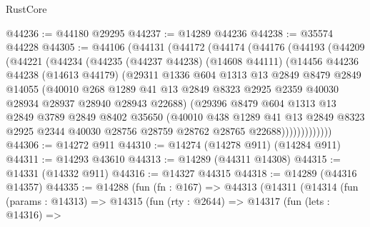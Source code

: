 \begin{lexlean}{RustCore}
\begin{coremodule}
@44236 := @44180 @29295
@44237 := @14289 @44236
@44238 := @35574 @44228
@44305 := @44106
    (@44131
      (@44172
        (@44174
          (@44176
            (@44193
              (@44209
                (@44221
                  (@44234
                    (@44235
                      (@44237 @44238)
                      (@14608 @44111)
                      (@14456
                        @44236
                        @44238
                        (@14613 @44179)
                        (@29311
                          @1336
                          @604
                          @1313
                          @13
                          @2849
                          @8479
                          @2849
                          @14055
                          (@40010
                            @268
                            @1289
                            @41
                            @13
                            @2849
                            @8323
                            @2925
                            @2359
                            @40030
                            @28934
                            @28937
                            @28940
                            @28943
                            @22688)
                          (@29396
                            @8479
                            @604
                            @1313
                            @13
                            @2849
                            @3789
                            @2849
                            @8402
                            @35650
                            (@40010
                              @438
                              @1289
                              @41
                              @13
                              @2849
                              @8323
                              @2925
                              @2344
                              @40030
                              @28756
                              @28759
                              @28762
                              @28765
                              @22688)))))))))))))
@44306 := @14272 @911
@44310 := @14274 (@14278 @911) (@14284 @911)
@44311 := @14293 @43610
@44313 := @14289 (@44311 @14308)
@44315 := @14331 (@14332 @911)
@44316 := @14327 @44315
@44318 := @14289 (@44316 @14357)
@44335 := @14288
    (fun (fn : @167) =>
    @44313
      (@14311
        (@14314
          (fun (params : @14313) =>
          @14315
            (fun (rty : @2644) =>
            @14317
              (fun (lets : @14316) =>

\end{coremodule}
\end{lexlean}
